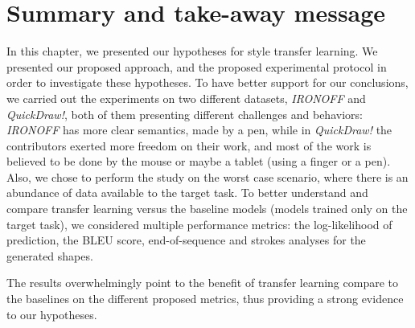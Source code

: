 \section{Summary and take-away message}
\par In this chapter, we presented our hypotheses for style transfer learning. We presented our proposed approach, and the proposed experimental protocol in order to investigate these hypotheses. To have better support for our conclusions, we carried out the experiments on two different datasets, \textit{IRONOFF} and \textit{QuickDraw!}, both of them presenting different challenges and behaviors: \textit{IRONOFF} has more clear semantics, made by a pen, while in \textit{QuickDraw!} the contributors exerted more freedom on their work, and most of the work is believed to be done by the mouse or maybe a tablet (using a finger or a pen). Also, we chose to perform the study on the worst case scenario, where there is an abundance of data available to the target task. To better understand and compare transfer learning versus the baseline models (models trained only on the target task), we considered multiple performance metrics: the log-likelihood of prediction, the BLEU score, end-of-sequence and strokes analyses for the generated shapes.

\par The results overwhelmingly point to the benefit of transfer learning compare to the baselines on the different proposed metrics, thus providing a strong evidence to our hypotheses.
